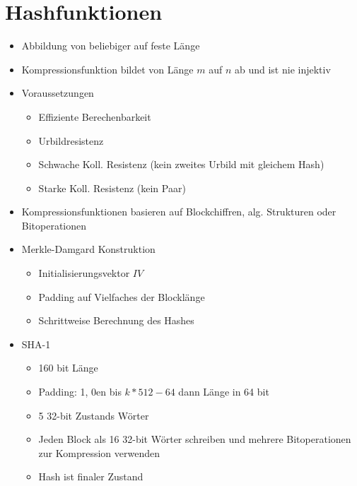\documentclass[11pt, paper=a4, twocolumn]{scrartcl}
\begin{document}
	\section{Hashfunktionen}
		\begin{itemize}
			\item Abbildung von beliebiger auf feste Länge
			\item Kompressionsfunktion bildet von Länge $m$ auf $n$ ab und ist nie injektiv
			\item Voraussetzungen
				\begin{itemize}
					\item Effiziente Berechenbarkeit
					\item Urbildresistenz
					\item Schwache Koll. Resistenz (kein zweites Urbild mit gleichem Hash)
					\item Starke Koll. Resistenz (kein Paar)
				\end{itemize}
			\item Kompressionsfunktionen basieren auf Blockchiffren, alg. Strukturen oder Bitoperationen
			\item Merkle-Damgard Konstruktion
				\begin{itemize}
					\item Initialisierungsvektor $IV$
					\item Padding auf Vielfaches der Blocklänge
					\item Schrittweise Berechnung des Hashes
				\end{itemize}
			\item SHA-1
				\begin{itemize}
					\item 160 bit Länge
					\item Padding: 1, 0en bis $k*512-64$ dann Länge in 64 bit
					\item 5 32-bit Zustands Wörter
					\item Jeden Block als 16 32-bit Wörter schreiben und mehrere Bitoperationen zur Kompression verwenden
					\item Hash ist finaler Zustand
				\end{itemize}
		\end{itemize}
	
\end{document}
